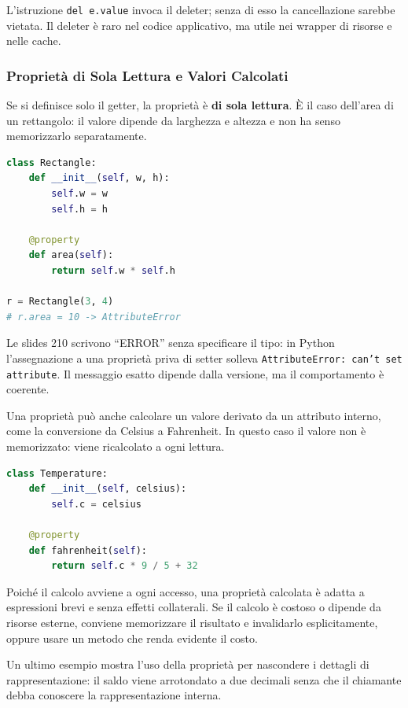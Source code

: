 \documentclass[12pt]{extarticle}
\begin{document}
\noindent L'istruzione \texttt{del e.value} invoca il deleter; senza di esso la cancellazione sarebbe vietata. Il deleter è raro nel codice applicativo, ma utile nei wrapper di risorse e nelle cache.

\subsubsection{Proprietà di Sola Lettura e Valori Calcolati}

\noindent Se si definisce solo il getter, la proprietà è \textbf{di sola lettura}. È il caso dell'area di un rettangolo: il valore dipende da larghezza e altezza e non ha senso memorizzarlo separatamente.

\begin{lstlisting}[language=Python]
class Rectangle:
    def __init__(self, w, h):
        self.w = w
        self.h = h

    @property
    def area(self):
        return self.w * self.h

r = Rectangle(3, 4)
# r.area = 10 -> AttributeError
\end{lstlisting}

\noindent Le slides 210 scrivono ``ERROR'' senza specificare il tipo: in Python l'assegnazione a una proprietà priva di setter solleva \texttt{AttributeError: can't set attribute}. Il messaggio esatto dipende dalla versione, ma il comportamento è coerente.

\noindent Una proprietà può anche calcolare un valore derivato da un attributo interno, come la conversione da Celsius a Fahrenheit. In questo caso il valore non è memorizzato: viene ricalcolato a ogni lettura.

\begin{lstlisting}[language=Python]
class Temperature:
    def __init__(self, celsius):
        self.c = celsius

    @property
    def fahrenheit(self):
        return self.c * 9 / 5 + 32
\end{lstlisting}

\noindent Poiché il calcolo avviene a ogni accesso, una proprietà calcolata è adatta a espressioni brevi e senza effetti collaterali. Se il calcolo è costoso o dipende da risorse esterne, conviene memorizzare il risultato e invalidarlo esplicitamente, oppure usare un metodo che renda evidente il costo.

\noindent Un ultimo esempio mostra l'uso della proprietà per nascondere i dettagli di rappresentazione: il saldo viene arrotondato a due decimali senza che il chiamante debba conoscere la rappresentazione interna.
\end{document}

